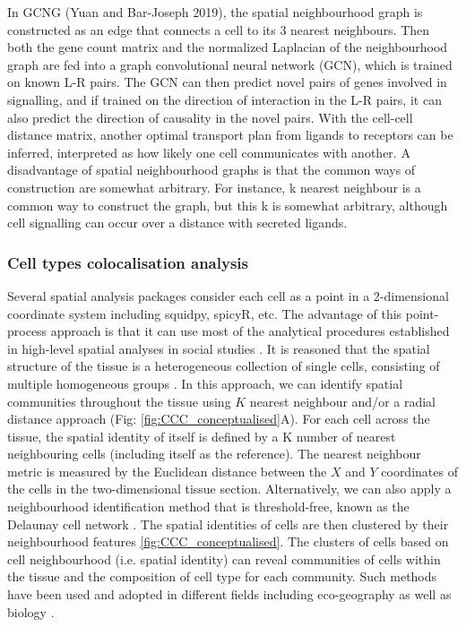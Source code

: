 In GCNG (Yuan and Bar-Joseph 2019), the spatial neighbourhood graph is constructed as an edge that connects a cell to its 3 nearest neighbours. Then both the gene count matrix and the normalized Laplacian of the neighbourhood graph are fed into a graph convolutional neural network (GCN), which is trained on known L-R pairs. The GCN can then predict novel pairs of genes involved in signalling, and if trained on the direction of interaction in the L-R pairs, it can also predict the direction of causality in the novel pairs. With the cell-cell distance matrix, another optimal transport plan from ligands to receptors can be inferred, interpreted as how likely one cell communicates with another. A disadvantage of spatial neighbourhood graphs is that the common ways of construction are somewhat arbitrary. For instance, k nearest neighbour is a common way to construct the graph, but this k is somewhat arbitrary, although cell signalling can occur over a distance with secreted ligands.

\subsubsection{Cell types colocalisation analysis}
Several spatial analysis packages consider each cell as a point in a 2-dimensional coordinate system including squidpy, spicyR, etc. The advantage of this point-process approach is that it can use most of the analytical procedures established in high-level spatial analyses in social studies \cite{yushimito2012voronoi}. It is reasoned that the spatial structure of the tissue is a heterogeneous collection of single cells, consisting of multiple homogeneous groups \cite{schurch2020coordinated}. In this approach, we can identify spatial communities throughout the tissue using $K$ nearest neighbour and/or a radial distance approach (Fig: \ref{fig:CCC_conceptualised}A). For each cell across the tissue, the spatial identity of itself is defined by a K number of nearest neighbouring cells (including itself as the reference). The nearest neighbour metric is measured by the Euclidean distance between the $X$ and $Y$ coordinates of the cells in the two-dimensional tissue section. Alternatively, we can also apply a neighbourhood identification method that is threshold-free, known as the Delaunay cell network \cite{guibas1985primitives, dries2021giotto}. The spatial identities of cells are then clustered by their neighbourhood features \ref{fig:CCC_conceptualised}. The clusters of cells based on cell neighbourhood (i.e. spatial identity) can reveal communities of cells within the tissue and the composition of cell type for each community. Such methods have been used and adopted in different fields including eco-geography as well as biology \cite{goltsev2018CODEX, dries2021giotto}.

